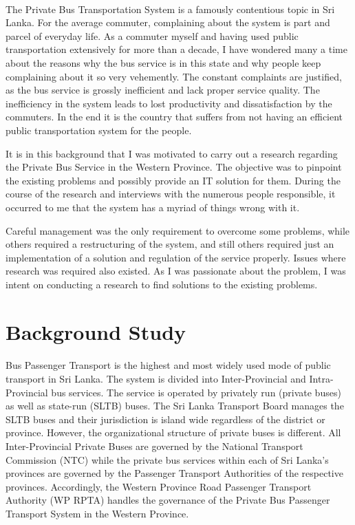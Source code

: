 \documentclass[12pt, oneside]{report}
\begin{document}
\paragraph{ } The Private Bus Transportation System is a famously contentious topic in Sri Lanka. For the average commuter, complaining about the system is part and parcel of everyday life. As a commuter myself and having used public transportation extensively for more than a decade, I have wondered many a time about the reasons why the bus service is in this state and why people keep complaining about it so very vehemently. The constant complaints are justified, as the bus service is grossly inefficient and lack proper service quality. The inefficiency in the system leads to lost productivity and dissatisfaction by the commuters. In the end it is the country that suffers from not having an efficient public transportation system for the people.

It is in this background that I was motivated to carry out a research regarding the Private Bus Service in the Western Province. The objective was to pinpoint the existing problems and possibly provide an IT solution for them. During the course of the research and interviews with the numerous people responsible, it occurred to me that the system has a myriad of things wrong with it. 

Careful management was the only requirement to overcome some problems, while others required a restructuring of the system, and still others required just an implementation of a solution and regulation of the service properly. Issues where research was required also existed. As I was passionate about the problem, I was intent on conducting a research to find solutions to the existing problems.

\newpage

\section{Background Study}
\label{section-BackgroundStudy}

\paragraph{ } Bus Passenger Transport is the highest and most widely used mode of public transport in Sri Lanka. The system is divided into Inter-Provincial and Intra-Provincial bus services. The service is operated by privately run (private buses) as well as state-run (SLTB) buses. The Sri Lanka Transport Board manages the SLTB buses and their jurisdiction is island wide regardless of the district or province. However, the organizational structure of private buses is different. All Inter-Provincial Private Buses are governed by the National Transport Commission (NTC) while the private bus services within each of Sri Lanka’s provinces are governed by the Passenger Transport Authorities of the respective provinces. Accordingly, the Western Province Road Passenger Transport Authority (WP RPTA) handles the governance of the Private Bus Passenger Transport System in the Western Province.
\end{document}
